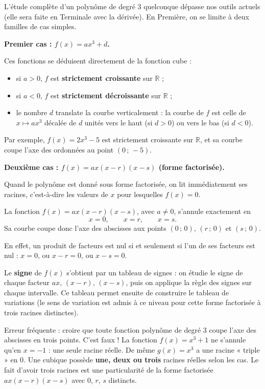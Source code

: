 \documentclass[11pt]{article}
\newcommand{\cle}[1]{{\popxbold\color{popdark}#1}}
\newcounter{popsec}
\newcounter{popsub}
\newcommand{\courssub}[1]{%
  \stepcounter{popsub}%
  \par\vspace{9pt}\noindent{\popxbold\fontsize{11.5}{13}\selectfont\color{popink}{\color{poporange}\thepopsec.\thepopsub}\hspace{6pt}#1}\par\nopagebreak\vspace{4pt}
}
\begin{document}
\courssub{Cas simples étudiés en Première}

L'étude complète d'un polynôme de degré 3 quelconque dépasse nos outils actuels (elle sera faite en Terminale avec la dérivée). En Première, on se limite à deux familles de cas simples.

\textbf{Premier cas : $f(x) = ax^3 + d$.}

Ces fonctions se déduisent directement de la fonction cube :
\begin{itemize}
\item si $a > 0$, $f$ est \textbf{strictement croissante} sur $\mathbb{R}$ ;
\item si $a < 0$, $f$ est \textbf{strictement décroissante} sur $\mathbb{R}$ ;
\item le nombre $d$ translate la courbe verticalement : la courbe de $f$ est celle de $x \mapsto ax^3$ décalée de $d$ unités vers le haut (si $d > 0$) ou vers le bas (si $d < 0$).
\end{itemize}
Par exemple, $f(x) = 2x^3 - 5$ est strictement croissante sur $\mathbb{R}$, et sa courbe coupe l'axe des ordonnées au point $(0\,;\,-5)$.

\textbf{Deuxième cas : $f(x) = ax(x - r)(x - s)$ (forme factorisée).}

Quand le polynôme est donné sous forme factorisée, on lit immédiatement ses \cle{racines}, c'est-à-dire les valeurs de $x$ pour lesquelles $f(x) = 0$.

\begin{propriete}
La fonction $f(x) = ax(x - r)(x - s)$, avec $a \neq 0$, s'annule exactement en
\[ x = 0, \qquad x = r, \qquad x = s. \]
Sa courbe coupe donc l'axe des abscisses aux points $(0\,;\,0)$, $(r\,;\,0)$ et $(s\,;\,0)$.
\end{propriete}

En effet, un produit de facteurs est nul si et seulement si l'un de ses facteurs est nul : $x = 0$, ou $x - r = 0$, ou $x - s = 0$.

Le \textbf{signe} de $f(x)$ s'obtient par un tableau de signes : on étudie le signe de chaque facteur $ax$, $(x - r)$, $(x - s)$, puis on applique la règle des signes sur chaque intervalle. Ce tableau permet ensuite de construire le tableau de variations (le sens de variation est admis à ce niveau pour cette forme factorisée à trois racines distinctes).

\begin{attention}
Erreur fréquente : croire que toute fonction polynôme de degré 3 coupe l'axe des abscisses en trois points. C'est faux ! La fonction $f(x) = x^3 + 1$ ne s'annule qu'en $x = -1$ : une seule racine réelle. De même $g(x) = x^3$ a une racine « triple » en $0$. Une cubique possède \textbf{une, deux ou trois} racines réelles selon les cas. Le fait d'avoir trois racines est une particularité de la forme factorisée $ax(x-r)(x-s)$ avec $0$, $r$, $s$ distincts.
\end{attention}
\end{document}

